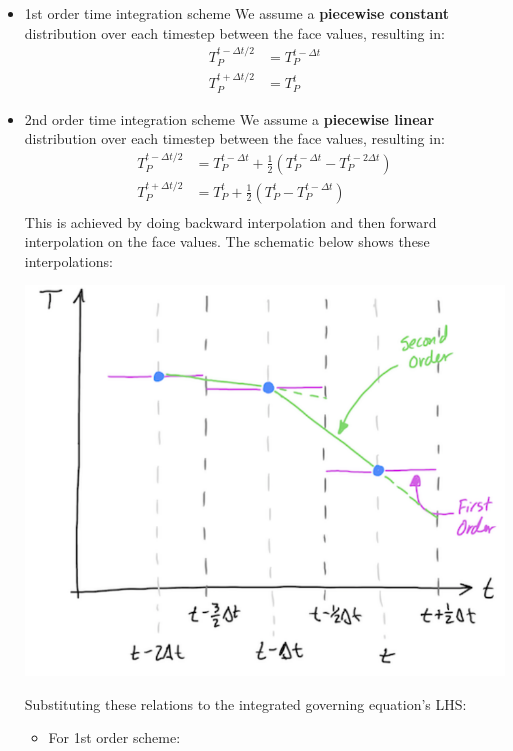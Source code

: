 \documentclass[11pt]{article}
\begin{document}
\begin{itemize}
\item 1st order time integration scheme
We assume a \textbf{piecewise constant} distribution over each timestep between the face values, resulting in:
\begin{align*}
T_P^{t-\Delta t /2 } &= T_P^{t-\Delta t }\\
T_P^{t+\Delta t /2 } &= T_P^{t}
\end{align*}
\item 2nd order time integration scheme
We assume a \textbf{piecewise linear} distribution over each timestep between the face values, resulting in:
\begin{align*}
T_P^{t-\Delta t /2} &= T_P^{t-\Delta t } + \frac{1}{2}(T_P^{t-\Delta t} - T_P^{t-2\Delta t})\\
T_P^{t+\Delta t /2} &= T_P^{t} + \frac{1}{2}(T_P^{t} - T_P^{t-\Delta t})\\
\end{align*}
This is achieved by doing backward interpolation and then forward interpolation on the face values.
The schematic below shows these interpolations:
\begin{center}
\includegraphics[scale=0.5]{pic/2nd_order_implicit_interpolation.png}
\end{center}
Substituting these relations to the integrated governing equation's LHS:
\begin{itemize}
\item For 1st order scheme:
\begin{equation}

\end{equation}
\end{itemize}
\end{itemize}
\end{document}

